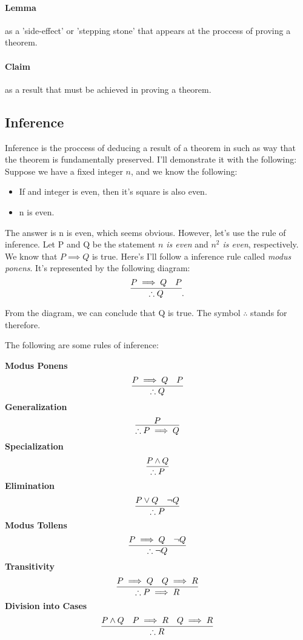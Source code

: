 \documentclass[a4paper]{article}
\begin{document}
\paragraph{Lemma} as a 'side-effect' or 'stepping stone' that appears at the proccess of proving a theorem.

\paragraph{Claim} as a result that must be achieved in proving a theorem.
\subsection{Inference}
Inference is the proccess of deducing a result of a theorem in such as way that the theorem is fundamentally preserved. I'll demonstrate it with the following:
Suppose we have a fixed integer $n$, and we know the following:
 \begin{itemize}
	\item If and integer is even, then it's square is also even.
	\item n is even.
\end{itemize}
The answer is n is even, which seems obvious. However, let's use the rule of inference. Let P and Q be the statement \textit{$n$ is even} and \textit{$n ^ 2$ is even}, respectively. We know that $P \implies Q$ is true. Here's I'll follow a inference rule called \textit{modus ponens}. It's represented by the following diagram:
 \[
	 \infer{\therefore Q}{P \implies Q & P}
.\] 

\noindent From the diagram, we can conclude that Q is true. The symbol $\therefore$ stands for therefore.

The following are some rules of inference:
\begin{tcolorbox}[title= Rules of Inference]
	\begin{multicols}{2}
\textbf{Modus Ponens}
		\[	
			\infer{\therefore Q}{P \implies Q & P}
		\]
		\textbf{Generalization}
		\[	
			\infer{\therefore P \implies Q}{P}
		\]
		\textbf{Specialization}
		\[	
			\infer{\therefore P}{P \wedge Q}
		\]
		\textbf{Elimination}
		\[		
			\infer{\therefore P}{P \vee Q & \neg Q}
		\]	
		\textbf{Modus Tollens}
		\[		
			\infer{\therefore \neg Q}{P \implies Q & \neg Q}
		\]	
\textbf{Transitivity}
		\[	
			\infer{\therefore P \implies R}{P \implies Q & Q \implies R}
		\]		
		\textbf{Division into Cases}
		\[		
			\infer{\therefore R}{P \wedge Q & P \implies R & Q \implies R}
		\]


	\end{multicols}
\end{tcolorbox}
\end{document}
